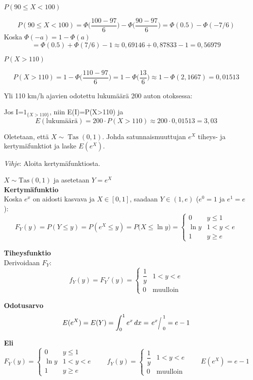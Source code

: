 \documentclass[12pt,a4paper]{article}
\begin{document}
\begin{kohta}
  \item $P(90\le X<100)$

  \[
  P(90\le X<100)=\Phi\!\Big(\frac{100-97}{6}\Big)-\Phi\!\Big(\frac{90-97}{6}\Big)
  =\Phi(0.5)-\Phi(-7/6)
  \]
  Koska $\Phi(-a)=1-\Phi(a)$
  \[
  =\Phi(0.5)+\Phi(7/6)-1 \approx 0{,}69146+0{,}87833-1
  = 0{,}56979
  \]

  \item $P(X>110)$

  \[
  P(X>110)=1-\Phi\!\Big(\frac{110-97}{6}\Big)=1-\Phi\!\Big(\frac{13}{6}\Big)
  \approx 1-\Phi(2{,}1667)=0{,}01513
  \]

  \item Yli 110 km/h ajavien odotettu lukumäärä 200 auton otoksessa:

  Jos I=$1_{\{X>110\}}$, niin E(I)=P(X>110) ja
  \[
  E(\text{lukumäärä})=200\cdot P(X>110)\approx 200\cdot 0{,}01513
  = 3{,}03
  \]
\end{kohta}









\pagebreak
{}
Oletetaan, että $X\sim\operatorname{Tas}(0,1)$.
Johda satunnaismuuttujan $e^X$ tiheys- ja kertymäfunktiot ja laske $E(e^X)$.

\noindent\emph{Vihje}: Aloita kertymäfunktiosta.
\vspace{0.8cm}


$X\sim\mathrm{Tas}(0,1)$ ja asetetaan $Y=e^X$\\

\textbf{Kertymäfunktio}\\
Koska $e^x$ on aidosti kasvava ja $X\in[0,1]$, saadaan $Y\in(1,e)$ ($e^0=1$ ja $e^1=e$):
\[
F_Y(y)=P(Y\le y)=P(e^X\le y)=P\!\big(X\le \ln y\big)=
\begin{cases}
0 & y\le 1\\[2pt]
\ln y & 1<y<e\\[2pt]
1 & y\ge e
\end{cases}
\]

\textbf{Tiheysfunktio}\\
Derivoidaan $F_Y$:
\[
f_Y(y)=F_Y'(y)=
\begin{cases}
\dfrac{1}{y} & 1<y<e\\[6pt]
0 & \text{muulloin}
\end{cases}
\]

\textbf{Odotusarvo}\\
\[
E(e^X)=E(Y)=\int_{0}^{1} e^x\,dx
= \evalslant{e^x}{0}{1}
=e-1
\]

\textbf{Eli}\\
\[
F_Y(y)=
\begin{cases}
0& y\le 1\\
\ln y& 1<y<e\\
1& y\ge e
\end{cases}
\qquad
f_Y(y)=
\begin{cases}
\dfrac{1}{y}& 1<y<e\\
0& \text{muulloin}
\end{cases}
\qquad
E(e^X)=e-1
\]
\end{document}
